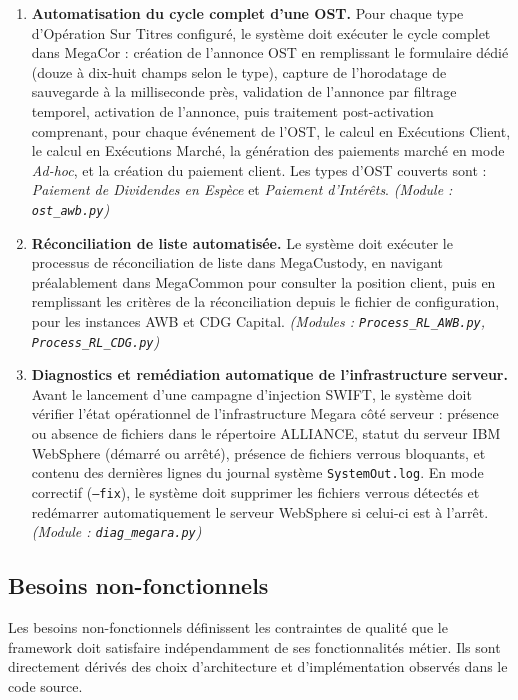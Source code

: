 \documentclass[12pt, a4paper]{report}
\begin{document}
\begin{enumerate}[label=\textbf{BF\arabic*.}, leftmargin=*, itemsep=6pt]
  \item \textbf{Automatisation du cycle complet d'une OST.}
  Pour chaque type d'Opération Sur Titres configuré, le système doit exécuter le cycle complet dans MegaCor : création de l'annonce OST en remplissant le formulaire dédié (douze à dix-huit champs selon le type), capture de l'horodatage de sauvegarde à la milliseconde près, validation de l'annonce par filtrage temporel, activation de l'annonce, puis traitement post-activation comprenant, pour chaque événement de l'OST, le calcul en Exécutions Client, le calcul en Exécutions Marché, la génération des paiements marché en mode \textit{Ad-hoc}, et la création du paiement client. Les types d'OST couverts sont : \textit{Paiement de Dividendes en Espèce} et \textit{Paiement d'Intérêts}.
  \textit{(Module : \texttt{ost\_awb.py})}

  \item \textbf{Réconciliation de liste automatisée.}
  Le système doit exécuter le processus de réconciliation de liste dans MegaCustody, en navigant préalablement dans MegaCommon pour consulter la position client, puis en remplissant les critères de la réconciliation depuis le fichier de configuration, pour les instances AWB et CDG Capital.
  \textit{(Modules : \texttt{Process\_RL\_AWB.py}, \texttt{Process\_RL\_CDG.py})}

  \item \textbf{Diagnostics et remédiation automatique de l'infrastructure serveur.}
  Avant le lancement d'une campagne d'injection SWIFT, le système doit vérifier l'état opérationnel de l'infrastructure Megara côté serveur : présence ou absence de fichiers dans le répertoire ALLIANCE, statut du serveur IBM WebSphere (démarré ou arrêté), présence de fichiers verrous bloquants, et contenu des dernières lignes du journal système \texttt{SystemOut.log}. En mode correctif (\texttt{--fix}), le système doit supprimer les fichiers verrous détectés et redémarrer automatiquement le serveur WebSphere si celui-ci est à l'arrêt.
  \textit{(Module : \texttt{diag\_megara.py})}

\end{enumerate}

\subsection{Besoins non-fonctionnels}

Les besoins non-fonctionnels définissent les contraintes de qualité que le framework doit satisfaire indépendamment de ses fonctionnalités métier. Ils sont directement dérivés des choix d'architecture et d'implémentation observés dans le code source.
\end{document}
